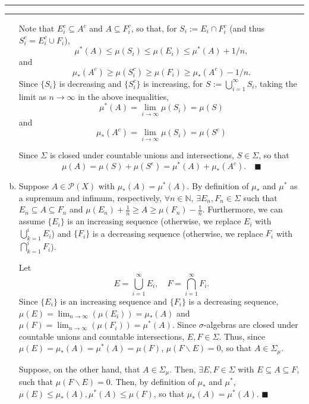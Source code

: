 \documentclass[11pt]{article}
\newcounter{questionCounter}
\newcounter{partCounter}[questionCounter]
\newenvironment{question}[2][\arabic{questionCounter}]{%
    \setcounter{partCounter}{0}%
    \vspace{.25in} \hrule \vspace{0.5em}%
        \noindent{\bf #2}%
    \vspace{0.8em} \hrule \vspace{.10in}%
    \addtocounter{questionCounter}{1}%
}{}
\renewcommand{\qed}{\quad $\blacksquare$}
\newcommand{\mqed}{\quad \blacksquare}
\newcommand{\sminus}{\backslash}
\newcommand{\N}{\mathbb{N}} %
\newcommand{\pow}[1]{\mathcal{P}\left(#1\right)} %
\begin{document}
\begin{question}{Problem 1}
\begin{enumerate}[(a)]
Note that $E_i^c \subseteq A^c$ and $A \subseteq F_i^c$, so that, for 
$S_i := E_i \cap F_i^c$ (and thus $S_i^c = E_i^c \cup F_i$),
\[\mu^*(A) \leq \mu(S_i) \leq \mu(E_i) \leq \mu^*(A) + 1/n,\]
and
\[\mu_*(A^c) \geq \mu(S_i^c) \geq \mu(F_i) \geq \mu_*(A^c) - 1/n.\]
Since $\{S_i\}$ is decreasing and $\{S_i^c\}$ is increasing,
for $S := \bigcup_{i = 1}^{\infty} S_i$, taking the limit as
$n \rightarrow \infty$ in the above inequalities,
\[\mu^*(A) = \lim_{i \rightarrow \infty} \mu(S_i) = \mu\left( S \right)\]
and
\[\mu_*(A^c) = \lim_{i \rightarrow \infty} \mu(S_i) = \mu\left( S^c \right)\]

Since $\Sigma$ is closed under countable unions and intersections,
$S \in \Sigma$, so that
\[\mu(A) = \mu(S) + \mu(S^c) = \mu^*(A) + \mu_*(A^c). \mqed\]

\item Suppose $A \in \pow{X}$ with $\mu_*(A) = \mu^*(A)$. By definition of
$\mu_*$ and $\mu^*$ as a supremum and infimum, respectively,
$\forall n \in \N$, $\exists E_n, F_n \in \Sigma$ such that
$E_n \subseteq A \subseteq F_n$ and
$\mu(E_n) + \frac{1}{n} \geq A \geq \mu(F_n) - \frac{1}{n}$. Furthermore,
we can assume $\{E_i\}$ is an increasing sequence (otherwise, we replace $E_i$
with $\bigcup_{k = 1}^i E_i$) and $\{F_i\}$ is a decreasing sequence
(otherwise, we replace $F_i$ with $\bigcap_{k = 1}^i F_i$).

Let \[E = \bigcup_{i = 1}^{\infty} E_i,
\quad F = \bigcap_{i = 1}^{\infty} F_i.\]
Since $\{E_i\}$ is an increasing sequence and $\{F_i\}$ is a decreasing
sequence, $\mu(E) = \lim_{n \rightarrow \infty}(\mu(E_i)) = \mu_*(A)$ and
$\mu(F) = \lim_{n \rightarrow \infty}(\mu(F_i)) = \mu^*(A)$.
Since $\sigma$-algebras are closed under countable unions and countable
intersections, $E,F \in \Sigma$. Thus, since
$\mu(E) = \mu_*(A) = \mu^*(A) = \mu(F)$, $\mu(F \sminus E) = 0$, so that
$A \in \Sigma_{\mu}$.

Suppose, on the other hand, that $A \in \Sigma_{\mu}$. Then,
$\exists E,F \in \Sigma$ with $E \subseteq A \subseteq F$, such that
$\mu(F \sminus E) = 0$. Then, by definition of $\mu_*$ and $\mu^*$,
$\mu(E) \leq \mu_*(A),\mu^*(A) \leq \mu(F)$, so that $\mu_*(A) = \mu^*(A)$.
\qed
\end{enumerate}
\end{question}
\end{document}
